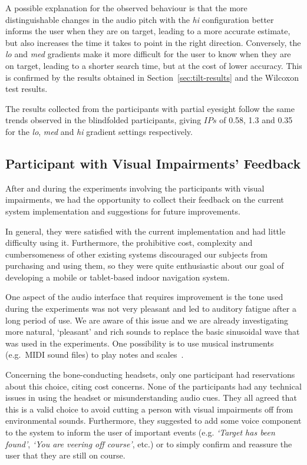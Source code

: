 \documentclass[sigconf, screen=true, anonymous=true]{acmart}
\begin{document}
A possible explanation for the observed behaviour is that the more distinguishable changes in the audio pitch with the \emph{hi} configuration better informs the user when they are on target, leading to a more accurate estimate, but also increases the time it takes to point in the right direction.
Conversely, the \emph{lo} and \emph{med} gradients make it more difficult for the user to know when they are on target, leading to a shorter search time, but at the cost of lower accuracy.
This is confirmed by the results obtained in Section~\ref{sec:tilt-results} and the Wilcoxon test results. 

The results collected from the participants with partial eyesight follow the same trends observed in the blindfolded participants, giving $IPs$ of 0.58, 1.3 and 0.35 for the \emph{lo}, \emph{med} and \emph{hi} gradient settings respectively.  

\subsection{Participant with Visual Impairments' Feedback}

After and during the experiments involving the participants with visual impairments, we had the opportunity to collect their feedback on the current system implementation and suggestions for future improvements.

In general, they were satisfied with the current implementation and had little difficulty using it.
Furthermore, the prohibitive cost, complexity and cumbersomeness of other existing systems discouraged our subjects from purchasing and using them, so they were quite enthusiastic about our goal of developing a mobile or tablet-based indoor navigation system. 

One aspect of the audio interface that requires improvement is the tone used during the experiments was not very pleasant and led to auditory fatigue after a long period of use.
We are aware of this issue and we are already investigating more natural, `pleasant' and rich sounds to replace the basic sinusoidal wave that was used in the experiments.
One possibility is to use musical instruments (e.g.\ MIDI sound files) to play notes and scales~\cite{brewster1998using}.

Concerning the bone-conducting headsets, only one participant had reservations about this choice, citing cost concerns.
None of the participants had any technical issues in using the headset or misunderstanding audio cues.
They all agreed that this is a valid choice to avoid cutting a person with visual impairments off from environmental sounds.
Furthermore, they suggested to add some voice component to the system to inform the user of important events (e.g. \emph{`Target has been found'}, \emph{`You are veering off course'}, etc.) or to simply confirm and reassure the user that they are still on course.
\end{document}
